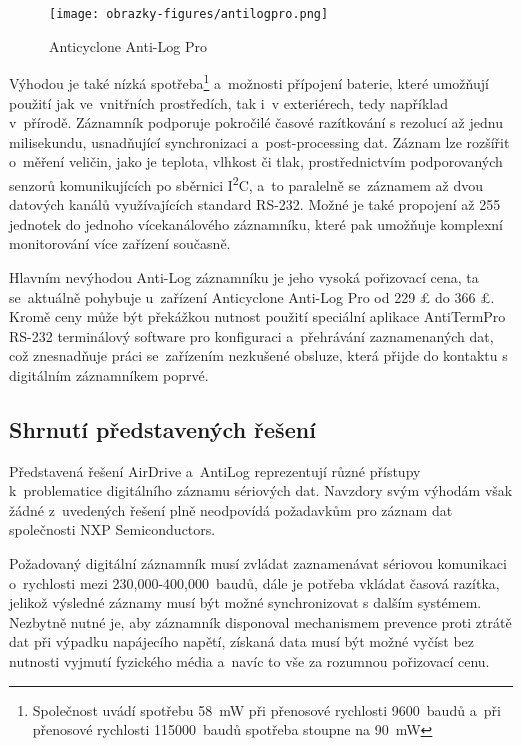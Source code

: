 \begin{figure}[h]
    \centering
    \texttt{[image: obrazky-figures/antilogpro.png]}
    
    \caption{Anticyclone Anti-Log Pro~\cite{anticyclone_systems_antilog_pro}}
    \label{fig:antilog-pro}
\end{figure}

Výhodou je také nízká spotřeba\footnote{Společnost uvádí spotřebu \SI{58}{\milli\watt} při přenosové rychlosti 9600~baudů a~při přenosové rychlosti 115000~baudů spotřeba stoupne na \SI{90}{\milli\watt}} a~možnosti přípojení baterie, které umožňují použití jak ve~vnitřních prostředích, tak i~v exteriérech, tedy například v~přírodě. Záznamník podporuje pokročilé časové razítkování s rezolucí až jednu milisekundu, usnadňující synchronizaci a~post-processing dat. Záznam lze rozšířit o~měření veličin, jako je teplota, vlhkost či tlak, prostřednictvím podporovaných senzorů komunikujících po sběrnici I\textsuperscript{2}C, a~to paralelně se~záznamem až dvou datových kanálů využívajících standard RS-232. Možné je také propojení až 255 jednotek do jednoho vícekanálového záznamníku, které pak umožňuje komplexní monitorování více zařízení současně.~\cite{anticyclone_systems_antilog_pro}

Hlavním nevýhodou Anti-Log záznamníku je jeho vysoká pořizovací cena, ta se~aktuálně pohybuje u~zařízení Anticyclone Anti-Log Pro od 229 £ do 366 £. Kromě ceny může být překážkou nutnost použití speciální aplikace AntiTermPro RS-232 terminálový software pro konfiguraci a~přehrávání zaznamenaných dat, což znesnadňuje práci se~zařízením nezkušené obsluze, která přijde do kontaktu s digitálním záznamníkem poprvé.~\cite{anticyclone_systems_antilog_pro}

\subsection{Shrnutí představených řešení}

Představená řešení AirDrive a~AntiLog reprezentují různé přístupy k~problematice digitálního záznamu sériových dat. Navzdory svým výhodám však žádné z~uvedených řešení plně neodpovídá požadavkům pro záznam dat společnosti NXP Semiconductors. 

Požadovaný digitální záznamník musí zvládat zaznamenávat sériovou komunikaci o~rychlosti mezi 230,000-400,000~baudů, dále je potřeba vkládat časová razítka, jelikož výsledné záznamy musí být možné synchronizovat s dalším systémem. Nezbytně nutné je, aby záznamník disponoval mechanismem prevence proti ztrátě dat při výpadku napájecího napětí, získaná data musí být možné vyčíst bez nutnosti vyjmutí fyzického média a~navíc to vše za rozumnou pořizovací cenu.

